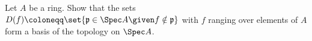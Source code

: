Let $A$ be a ring. Show that the sets
$D(f)\coloneqq \set{\mathfrak{p} \in \Spec A\given f\notin \mathfrak{p}}$
with $f$ ranging over elements of $A$ form a basis of the topology on $\Spec A$.
